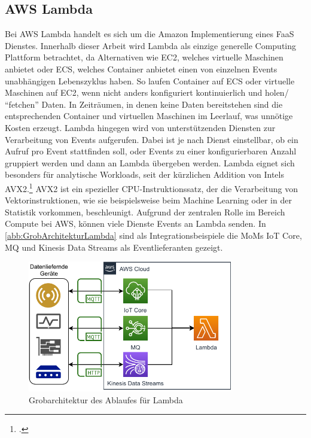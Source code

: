 \subsection{AWS Lambda}\label{chap:vergleich-lambda}


Bei \ac{AWS} Lambda handelt es sich um die Amazon Implementierung eines \ac{FaaS} Dienstes. Innerhalb dieser Arbeit wird Lambda als einzige generelle Computing Plattform betrachtet, da Alternativen wie \ac{EC2}, welches virtuelle Maschinen anbietet oder \ac{ECS}, welches Container anbietet einen von einzelnen Events unabhängigen Lebenszyklus haben. 
So laufen Container auf \ac{ECS} oder virtuelle Maschinen auf \ac{EC2}, wenn nicht anders konfiguriert kontinuierlich und holen/ \enquote{fetchen} Daten. In Zeiträumen, in denen keine Daten bereitstehen sind die entsprechenden Container und virtuellen Maschinen im Leerlauf, was unnötige Kosten erzeugt. Lambda hingegen wird von unterstützenden Diensten zur Verarbeitung von Events aufgerufen. 
Dabei ist je nach Dienst einstellbar, ob ein Aufruf pro Event stattfinden soll, oder Events zu einer konfigurierbaren Anzahl gruppiert werden und dann an Lambda übergeben werden. Lambda eignet sich besonders für analytische Workloads, seit der kürzlichen Addition von Intels \ac{AVX2}.\footcite[Vgl. auch im Folgenden][]{Beswick.24.11.2020} \ac{AVX2} ist ein spezieller CPU-Instruktionssatz, der die Verarbeitung von Vektorinstruktionen, wie sie beispielsweise beim Machine Learning oder in der Statistik vorkommen, beschleunigt. 
Aufgrund der zentralen Rolle im Bereich Compute bei \ac{AWS}, können viele Dienste Events an Lambda senden. In \autoref{abb:GrobArchitekturLambda} sind als Integrationsbeispiele die \acp{MoM} \ac{IoT} Core, MQ und Kinesis Data Streams als Eventlieferanten gezeigt.
\begin{figure}[H]
\centering
\includegraphics[width=0.8\textwidth]{graphics/Lambda-general.pdf}
\caption{Grobarchitektur des Ablaufes für Lambda}
\label{abb:GrobArchitekturLambda}
\end{figure}

